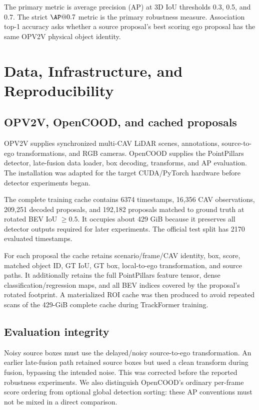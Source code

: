 \documentclass[11pt]{article}
\begin{document}
The primary metric is average precision (AP) at 3D IoU thresholds 0.3, 0.5,
and 0.7. The strict $\AP@0.7$ metric is the primary robustness measure.
Association top-1 accuracy asks whether a source proposal's best scoring ego
proposal has the same OPV2V physical object identity.

\section{Data, Infrastructure, and Reproducibility}

\subsection{OPV2V, OpenCOOD, and cached proposals}

OPV2V supplies synchronized multi-CAV LiDAR scenes, annotations,
source-to-ego transformations, and RGB cameras. OpenCOOD supplies the
PointPillars detector, late-fusion data loader, box decoding, transforms, and
AP evaluation. The installation was adapted for the target CUDA/PyTorch
hardware before detector experiments began.

The complete training cache contains 6374 timestamps, 16,356 CAV observations,
209,251 decoded proposals, and 192,182 proposals matched to ground truth at
rotated BEV IoU $\geq0.5$. It occupies about 429 GiB because it preserves all
detector outputs required for later experiments. The official test split has
2170 evaluated timestamps.

For each proposal the cache retains scenario/frame/CAV identity, box, score,
matched object ID, GT IoU, GT box, local-to-ego transformation, and source
paths. It additionally retains the full PointPillars feature tensor, dense
classification/regression maps, and all BEV indices covered by the proposal's
rotated footprint. A materialized ROI cache was then produced to avoid
repeated scans of the 429-GiB complete cache during TrackFormer training.

\subsection{Evaluation integrity}

Noisy source boxes must use the delayed/noisy source-to-ego transformation.
An earlier late-fusion path retained source boxes but used a clean transform
during fusion, bypassing the intended noise. This was corrected before the
reported robustness experiments. We also distinguish OpenCOOD's ordinary
per-frame score ordering from optional global detection sorting: these AP
conventions must not be mixed in a direct comparison.
\end{document}
